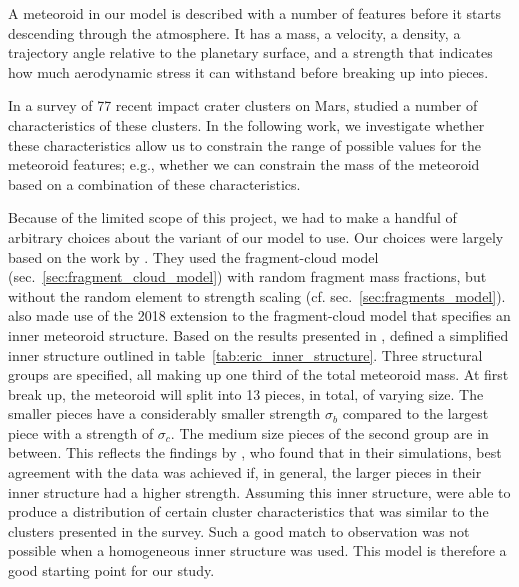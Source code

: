 \label{sec:characteristics}
A meteoroid in our model is described with a number of features before it starts descending through the atmosphere.
It has a mass, a velocity, a density, a trajectory angle relative to the planetary surface, and a strength that indicates how much aerodynamic stress it can withstand before breaking up into pieces. 

In a survey of 77 recent impact crater clusters on Mars, \cite{daubar2019recently} studied a number of characteristics of these clusters.
In the following work, we investigate whether these characteristics allow us to constrain the range of possible values for the meteoroid features; e.g., whether we can constrain the mass of the meteoroid based on a combination of these characteristics.

Because of the limited scope of this project, we had to make a handful of arbitrary choices about the variant of our model to use.
Our choices were largely based on the work by \cite{newland2019CFM18}. They used the fragment-cloud model (sec.~\ref{sec:fragment_cloud_model}) with random fragment mass fractions, but without the random element to strength scaling (cf. sec.~\ref{sec:fragments_model}).
\cite{newland2019CFM18} also made use of the 2018 extension to the fragment-cloud model that specifies an inner meteoroid structure.
Based on the results presented in \cite{wheeler2018atmospheric}, \cite{newland2019CFM18} defined a simplified inner structure outlined in table~\ref{tab:eric_inner_structure}.
Three structural groups are specified, all making up one third of the total meteoroid mass.
At first break up, the meteoroid will split into 13 pieces, in total, of varying size.
The smaller pieces have a considerably smaller strength $\sigma_b$ compared to the largest piece with a strength of $\sigma_c$. The medium size pieces of the second group are in between.
This reflects the findings by \cite{wheeler2018atmospheric}, who found that in their simulations, best agreement with the data was achieved if, in general, the larger pieces in their inner structure had a higher strength.
Assuming this inner structure, \cite{newland2019CFM18} were able to produce a distribution of certain cluster characteristics that was similar to the clusters presented in the \cite{daubar2019recently} survey. Such a good match to observation was not possible when a homogeneous inner structure was used.
This model is therefore a good starting point for our study.

